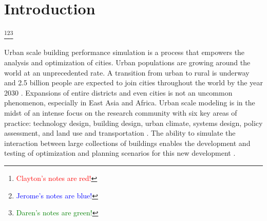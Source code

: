 \documentclass{tBPS2e}
\theoremstyle{plain}
\theoremstyle{definition}
\theoremstyle{remark}
\newcommand{\noteCM}[1]{\footnote{\textcolor{red}{#1}}}
\newcommand{\noteJK}[1]{\footnote{\textcolor{blue}{#1}}}
\newcommand{\noteDT}[1]{\footnote{\textcolor{green}{#1}}}
\begin{document}

\linenumbers

\section{Introduction}
\noteCM{Clayton's notes are red!}\noteJK{Jerome's notes are blue!}\noteDT{Daren's notes are green!}

Urban scale building performance simulation is a process that empowers the
analysis and optimization of cities. Urban populations are growing around the
world at an unprecedented rate. A transition from urban to rural is underway and
2.5 billion people are expected to join cities throughout the world by the year 2030
\citep{UnitedNations:2014vn}. Expansions of entire districts and even cities
is not an uncommon phenomenon, especially in East Asia and Africa. Urban scale
modeling is in the midst of an intense focus on the research community with
six key areas of practice: technology design, building design, urban climate,
systems design, policy assessment, and land use and transportation
\citep{Keirstead:2012ct}. The ability to simulate the interaction between
large collections of buildings enables the development and testing of
optimization and planning scenarios for this new development
\citep{Dorer:2013vt}.
\end{document}
